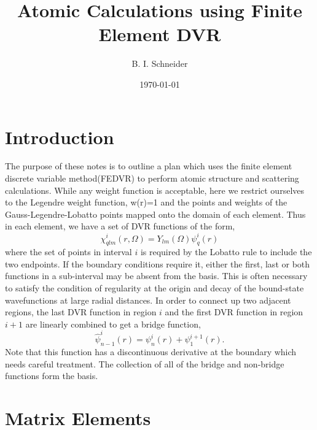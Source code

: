 \documentclass[preprint,showpacs,preprintnumbers,amsmath,amssymb]{revtex4}
\begin{document}
\title{Atomic Calculations using Finite Element DVR}
\author{B. I. Schneider}

\address{ Physics Division, National Science Foundation, Arlington,
Virginia 22230 and Electron and Optical Physics Division, National
Institute of Standards and Technology, Gaithersburg, MD 20899}

\date{\today}

\maketitle

%


\section{Introduction}
The purpose of these notes is to outline a plan which uses the finite 
element discrete variable method(FEDVR) to perform atomic structure and 
scattering calculations.  While any weight function is acceptable, here 
we restrict ourselves to the Legendre weight function, w(r)=1 and the 
points and weights of the Gauss-Legendre-Lobatto points mapped onto the 
domain of each element.  Thus in each element, we have a set of DVR 
functions of the form,
\begin{equation}
  \chi^{i}_{qlm}(r,\Omega)  = Y_{lm}(\Omega) \psi^{i}_{q}(r) 
\end{equation}
where the set of points in interval $i$ is required by the Lobatto rule 
to include the two endpoints.  If the boundary conditions require it, 
either the first, last or both functions in a sub-interval may be absent 
from the basis.  This is often necessary to satisfy the condition of 
regularity at the origin and decay of the bound-state wavefunctions 
at large radial distances.  In order to connect up two adjacent regions, 
the last DVR function in region $i$ and the first DVR function in 
region $i+1$ are linearly combined to get a bridge function,
\begin{equation}
  \hat \psi^{i}_{n-1}(r)  = \psi^{i}_{n}(r) + \psi^{i+1}_{1}(r).  
\end{equation}
Note that this function has a discontinuous derivative at the boundary 
which needs careful treatment.  The collection of all of the bridge and 
non-bridge functions form the basis.

\section{Matrix Elements}
\end{document}
